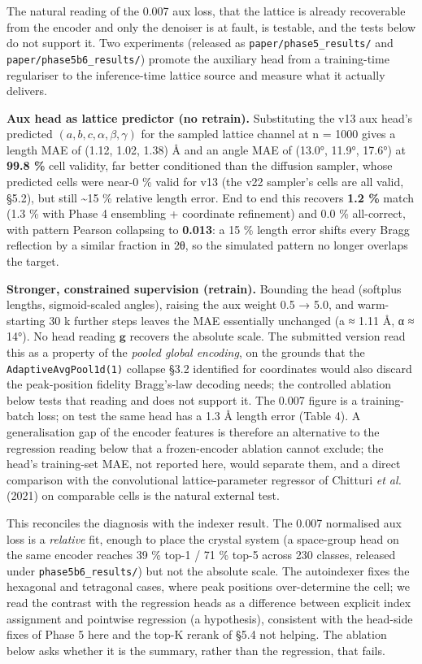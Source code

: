 \documentclass[
  11pt,
]{article}
\begin{document}
The natural reading of the 0.007 aux loss, that the lattice is already
recoverable from the encoder and only the denoiser is at fault, is
testable, and the tests below do not support it. Two experiments
(released as \texttt{paper/phase5\_results/} and
\texttt{paper/phase5b6\_results/}) promote the auxiliary head from a
training-time regulariser to the inference-time lattice source and
measure what it actually delivers.

\textbf{Aux head as lattice predictor (no retrain).} Substituting the
v13 aux head's predicted \((a,b,c,\alpha,\beta,\gamma)\) for the sampled
lattice channel at n = 1000 gives a length MAE of (1.12, 1.02, 1.38) Å
and an angle MAE of (13.0°, 11.9°, 17.6°) at \textbf{99.8 \%} cell
validity, far better conditioned than the diffusion sampler, whose
predicted cells were near-0 \% valid for v13 (the v22 sampler's cells
are all valid, §5.2), but still \textasciitilde15 \% relative length
error. End to end this recovers \textbf{1.2 \%} match (1.3 \% with Phase
4 ensembling + coordinate refinement) and 0.0 \% all-correct, with
pattern Pearson collapsing to \textbf{0.013}: a 15 \% length error
shifts every Bragg reflection by a similar fraction in 2θ, so the
simulated pattern no longer overlaps the target.

\textbf{Stronger, constrained supervision (retrain).} Bounding the head
(softplus lengths, sigmoid-scaled angles), raising the aux weight 0.5 →
5.0, and warm-starting 30 k further steps leaves the MAE essentially
unchanged (a ≈ 1.11 Å, α ≈ 14°). No head reading \(\mathbf{g}\) recovers
the absolute scale. The submitted version read this as a property of the
\emph{pooled global encoding}, on the grounds that the
\texttt{AdaptiveAvgPool1d(1)} collapse §3.2 identified for coordinates
would also discard the peak-position fidelity Bragg's-law decoding
needs; the controlled ablation below tests that reading and does not
support it. The 0.007 figure is a training-batch loss; on test the same
head has a 1.3 Å length error (Table 4). A generalisation gap of the
encoder features is therefore an alternative to the regression reading
below that a frozen-encoder ablation cannot exclude; the head's
training-set MAE, not reported here, would separate them, and a direct
comparison with the convolutional lattice-parameter regressor of
Chitturi \emph{et al.} (2021) on comparable cells is the natural
external test.

This reconciles the diagnosis with the indexer result. The 0.007
normalised aux loss is a \emph{relative} fit, enough to place the
crystal system (a space-group head on the same encoder reaches 39 \%
top-1 / 71 \% top-5 across 230 classes, released under
\texttt{phase5b6\_results/}) but not the absolute scale. The autoindexer
fixes the hexagonal and tetragonal cases, where peak positions
over-determine the cell; we read the contrast with the regression heads
as a difference between explicit index assignment and pointwise
regression (a hypothesis), consistent with the head-side fixes of Phase
5 here and the top-K rerank of §5.4 not helping. The ablation below asks
whether it is the summary, rather than the regression, that fails.
\end{document}
